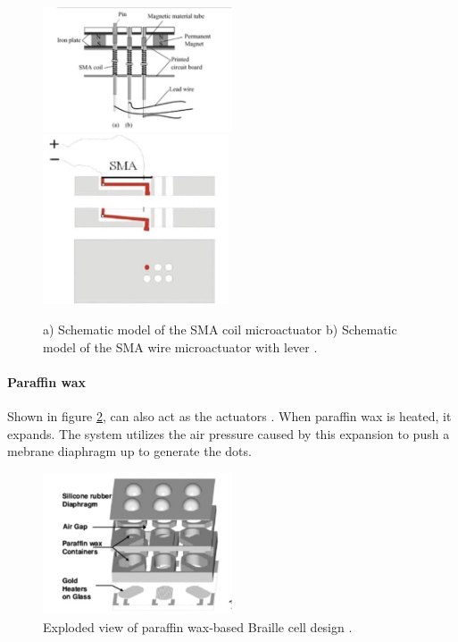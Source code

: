\begin{figure}[h]\centering
    \includegraphics[width=0.5\textwidth]{figures/sma-coil.png}
    \includegraphics[height=5cm]{figures/sma-mechanism.png}
    \caption[Schematics of Shaped Memory Alloy (SMA) mechanisms]{ a) Schematic model of the SMA coil microactuator b) Schematic model of the SMA wire microactuator with lever \cite{haga_dynamic_2005}.}
    \label{fig:sma}
\end{figure}

\paragraph{Paraffin wax}
Shown in figure \ref{fig:paraffin}, can also act as the actuators \cite{lee_micromachined_2005}. When paraffin wax is heated, it expands.
The system utilizes the air pressure caused by this expansion to push a mebrane diaphragm up to generate the dots.

\begin{figure}[h] \centering
    \includegraphics[width=0.5\textwidth]{figures/paraffin.png}
\caption[Paraffin-based Braille cell]{Exploded view of paraffin wax-based Braille cell design \cite{lee_micromachined_2005}.}
\label{fig:paraffin}
\end{figure}
